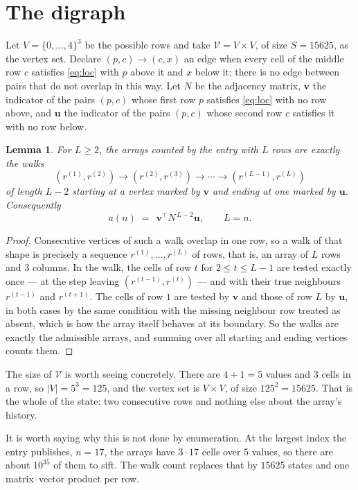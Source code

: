 \documentclass[11pt,a4paper]{article}
\theoremstyle{plain}
\newtheorem{lemma}[theorem]{Lemma}
\theoremstyle{definition}
\begin{document}
\section{The digraph}

Let $V=\{0,\dots,4\}^{3}$ be the possible rows and take
$\mathcal V=V\times V$, of size $S=15625$, as the vertex set. Declare $(p,c)\to(c,x)$ an edge
when every cell of the middle row $c$ satisfies \eqref{eq:loc} with $p$ above it and $x$
below it; there is no edge between pairs that do not overlap in this way. Let $N$ be the
adjacency matrix, $\mathbf{v}$ the indicator of the pairs $(p,c)$ whose first row $p$
satisfies \eqref{eq:loc} with no row above, and $\mathbf{u}$ the indicator of
the pairs $(p,c)$ whose second row $c$ satisfies it with no row below.

\begin{lemma}\label{lem:walk}
For $L\ge2$, the arrays counted by the entry with $L$ rows are exactly the walks
\[
(r^{(1)},r^{(2)})\to(r^{(2)},r^{(3)})\to\cdots\to(r^{(L-1)},r^{(L)})
\]
of length $L-2$ starting at a vertex marked by $\mathbf{v}$ and ending at one marked by
$\mathbf{u}$. Consequently
\[
a(n)\;=\;\,\mathbf{v}^{\!\top}N^{\,L-2}\mathbf{u},\qquad L=n .
\]
\end{lemma}

\begin{proof}
Consecutive vertices of such a walk overlap in one row, so a walk of that shape is
precisely a sequence $r^{(1)},\dots,r^{(L)}$ of rows, that is, an array of $L$ rows
and $3$ columns. In the walk, the cells of row $t$ for $2\le t\le L-1$ are tested
exactly once --- at the step leaving $(r^{(t-1)},r^{(t)})$ --- and with their true
neighbours $r^{(t-1)}$ and $r^{(t+1)}$. The cells of row $1$ are tested by
$\mathbf{v}$ and those of row $L$ by $\mathbf{u}$, in both cases by the same condition
with the missing neighbour row treated as absent, which is how the array itself behaves at
its boundary. So the walks are exactly the admissible arrays, and summing over all starting
and ending vertices counts them.
\end{proof}


The size of $\mathcal V$ is worth seeing concretely. There are $4+1=5$ values
and $3$ cells in a row, so $|V|=5^{3}=125$, and the vertex set is
$V\times V$, of size $125^2=15625$. That is the whole of the state: two consecutive
rows and nothing else about the array's history.

It is worth saying why this is not done by enumeration. At the largest index the entry
publishes, $n=17$, the arrays have $3\cdot17$ cells over
$5$ values, so there are about $10^{35}$ of them to sift. The
walk count replaces that by $15625$ states and one matrix--vector product per row.
\end{document}
